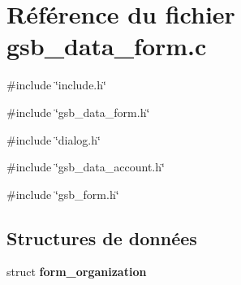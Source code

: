 \section{Référence du fichier gsb\_\-data\_\-form.c}
\label{gsb__data__form_8c}
{\ttfamily \#include \char`\"{}include.h\char`\"{}}\par
{\ttfamily \#include \char`\"{}gsb\_\-data\_\-form.h\char`\"{}}\par
{\ttfamily \#include \char`\"{}dialog.h\char`\"{}}\par
{\ttfamily \#include \char`\"{}gsb\_\-data\_\-account.h\char`\"{}}\par
{\ttfamily \#include \char`\"{}gsb\_\-form.h\char`\"{}}\par
\subsection*{Structures de données}
\begin{DoxyCompactItemize}
\item 
struct {\bf form\_\-organization}
\end{DoxyCompactItemize}
